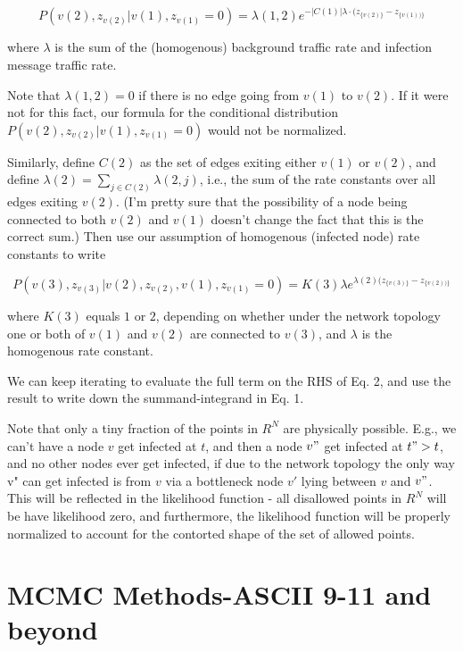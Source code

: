 \documentclass{article}
\begin{document}
	\begin{equation*}
	P(v(2), z_{v(2)} | v(1), z_{v(1)} = 0) =
		\lambda(1, 2) e^{-|C(1)| \lambda \cdot (z_{\{v(2)\}} - z_{\{v(1))\}}}
	\end{equation*}

	where $\lambda$ is the sum of the (homogenous) background traffic rate
	and infection message traffic rate. 

	Note that $\lambda(1, 2) = 0$ if there is no edge going from $v(1)$ to
	$v(2)$. If it were not for this fact, our formula for the conditional
	distribution $P(v(2), z_{v(2)} | v(1), z_{v(1)} = 0)$ would not be
	normalized.

	Similarly, define $C(2)$ as the set of edges exiting either $v(1)$ or
	$v(2)$, and define $\lambda(2) = \sum_{j \in C(2)} \lambda(2,j)$, i.e., the
	sum of the rate constants over all edges exiting $v(2)$. (I'm pretty
	sure that the possibility of a node being connected to both $v(2)$ and
	$v(1)$ doesn't change the fact that this is the correct sum.)  Then use
	our assumption of homogenous (infected node) rate constants to write

	\begin{equation*}
		P(v(3), z_{v(3)} | v(2), z_{v(2)}, v(1), z_{v(1)} = 0)  =  
			K(3) \lambda e^{\lambda(2) (z_{\{v(3)\}} - z_{\{v(2))\}}} 
	\end{equation*}

	where $K(3)$ equals $1$ or $2$, depending on whether under the network
	topology one or both of $v(1)$ and $v(2)$ are connected to $v(3)$, and
	$\lambda$ is the homogenous rate constant.

	We can keep iterating to evaluate the full term on the RHS of Eq. 2, and
	use the result to write down the summand-integrand in Eq. 1. 

	Note that only a tiny fraction of the points in $R^{N}$ are physically
	possible. E.g., we can't have a node $v$ get infected at $t$, and then a
	node $v"$ get infected at $t" > t$, and no other nodes ever get infected,
	if due to the network topology the only way v" can get infected is
	from $v$ via a bottleneck node $v'$ lying between $v$ and $v"$. This will be
	reflected in the likelihood function - all disallowed points in $R^{N}$
	will be have likelihood zero, and furthermore, the likelihood function
	will be properly normalized to account for the contorted shape of the
	set of allowed points.

\section{MCMC Methods-ASCII 9-11 and beyond}
\end{document}
